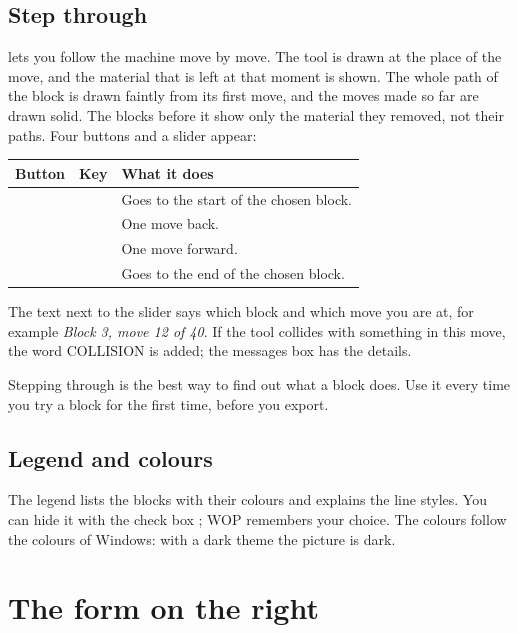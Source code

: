 \subsection{Step through}\label{sec:window:stepping}
 lets you follow the machine move by move. The tool is drawn at the place of the move, and the material that is left at that moment is shown. The whole path of the block is drawn faintly from its first move, and the moves made so far are drawn solid. The blocks before it show only the material they removed, not their paths. Four buttons and a slider appear:

\begin{center}
\begin{tabularx}{\textwidth}{@{}l l Y@{}}
\toprule
\textbf{Button} & \textbf{Key} & \textbf{What it does} \\
\midrule
\button{|<} &  & Goes to the start of the chosen block. \\
\button{<} &  & One move back. \\
\button{>} &  & One move forward. \\
\button{>|} &  & Goes to the end of the chosen block. \\
\bottomrule
\end{tabularx}
\end{center}

The text next to the slider says which block and which move you are at, for example \emph{Block 3, move 12 of 40}. If the tool collides with something in this move, the word \textsf{COLLISION} is added; the messages box has the details.

\begin{notebox}
Stepping through is the best way to find out what a block does. Use it every time you try a block for the first time, before you export.
\end{notebox}

\subsection{Legend and colours}
The legend lists the blocks with their colours and explains the line styles. You can hide it with the check box ; WOP remembers your choice. The colours follow the colours of Windows: with a dark theme the picture is dark.

\section{The form on the right}\label{sec:window:form}

